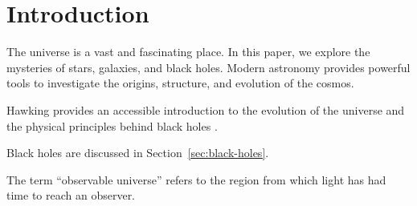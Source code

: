 \section{Introduction}
The universe is a vast and fascinating place. In this paper, we explore the mysteries of stars, galaxies, and black holes. Modern astronomy provides powerful tools to investigate the origins, structure, and evolution of the cosmos.

Hawking provides an accessible introduction to the evolution of the universe and the physical principles behind black holes \parencite{hawking1988}.

Black holes are discussed in Section~\ref{sec:black-holes}.

The term \enquote{observable universe} refers to the region from which light has had time to reach an observer.